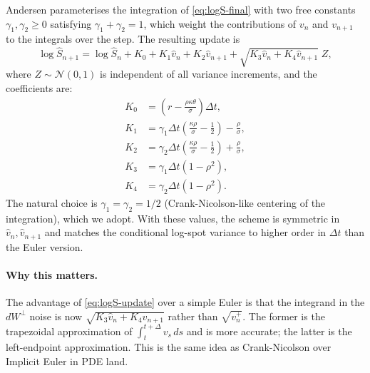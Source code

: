 \documentclass[11pt]{article}
\theoremstyle{plain}
\theoremstyle{definition}
\theoremstyle{remark}
\begin{document}
Andersen parameterises the integration of \eqref{eq:logS-final} with two free constants $\gamma_1, \gamma_2 \geq 0$ satisfying $\gamma_1 + \gamma_2 = 1$, which weight the contributions of $v_n$ and $v_{n+1}$ to the integrals over the step. The resulting update is
\begin{equation}
    \log \hat S_{n+1} = \log \hat S_n + K_0 + K_1 \hat v_n + K_2 \hat v_{n+1} + \sqrt{K_3 \hat v_n + K_4 \hat v_{n+1}}\; Z,                                                                                                       \label{eq:logS-update}
\end{equation}
where $Z \sim \mathcal{N}(0, 1)$ is independent of all variance increments, and the coefficients are:
\begin{align}
    K_0 &= \left(r - \tfrac{\rho\kappa\theta}{\sigma}\right) \Delta t,                                          \label{eq:K0}\\
    K_1 &= \gamma_1 \Delta t \left(\tfrac{\kappa\rho}{\sigma} - \tfrac12\right) - \tfrac{\rho}{\sigma},         \label{eq:K1}\\
    K_2 &= \gamma_2 \Delta t \left(\tfrac{\kappa\rho}{\sigma} - \tfrac12\right) + \tfrac{\rho}{\sigma},         \label{eq:K2}\\
    K_3 &= \gamma_1 \Delta t (1 - \rho^2),                                                                      \label{eq:K3}\\
    K_4 &= \gamma_2 \Delta t (1 - \rho^2).                                                                      \label{eq:K4}
\end{align}
The natural choice is $\gamma_1 = \gamma_2 = 1/2$ (Crank-Nicolson-like centering of the integration), which we adopt. With these values, the scheme is symmetric in $\hat v_n, \hat v_{n+1}$ and matches the conditional log-spot variance to higher order in $\Delta t$ than the Euler version.

\paragraph{Why this matters.} The advantage of \eqref{eq:logS-update} over a simple Euler is that the integrand in the $dW^\perp$ noise is now $\sqrt{K_3 \hat v_n + K_4 \hat v_{n+1}}$ rather than $\sqrt{v_n^+}$. The former is the trapezoidal approximation of $\int_t^{t+\Delta} v_s\, ds$ and is more accurate; the latter is the left-endpoint approximation. This is the same idea as Crank-Nicolson over Implicit Euler in PDE land.

\end{document}
